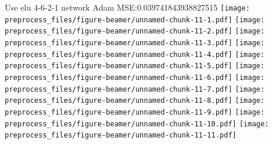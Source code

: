 \documentclass[ignorenonframetext,]{beamer}
\begin{document}
\begin{frame}[fragile]{Use elu 4-6-2-1 network Adam
MSE:0.039741843938827515}
\texttt{[image: preprocess\_files/figure-beamer/unnamed-chunk-11-1.pdf]}
\texttt{[image: preprocess\_files/figure-beamer/unnamed-chunk-11-2.pdf]}
\texttt{[image: preprocess\_files/figure-beamer/unnamed-chunk-11-3.pdf]}
\texttt{[image: preprocess\_files/figure-beamer/unnamed-chunk-11-4.pdf]}
\texttt{[image: preprocess\_files/figure-beamer/unnamed-chunk-11-5.pdf]}
\texttt{[image: preprocess\_files/figure-beamer/unnamed-chunk-11-6.pdf]}
\texttt{[image: preprocess\_files/figure-beamer/unnamed-chunk-11-7.pdf]}
\texttt{[image: preprocess\_files/figure-beamer/unnamed-chunk-11-8.pdf]}
\texttt{[image: preprocess\_files/figure-beamer/unnamed-chunk-11-9.pdf]}
\texttt{[image: preprocess\_files/figure-beamer/unnamed-chunk-11-10.pdf]}
\texttt{[image: preprocess\_files/figure-beamer/unnamed-chunk-11-11.pdf]}

\end{frame}
\end{document}
